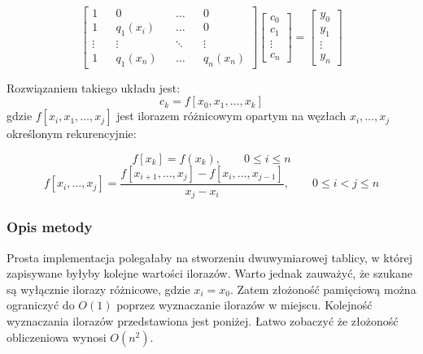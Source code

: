 \documentclass{article}
\begin{document}
\[
\begin{bmatrix}
    1 && 0 && \ldots && 0 \\
    1 && q_1(x_i) && \ldots && 0 \\
    \vdots && \vdots && \ddots && \vdots \\
    1 && q_1(x_n) && \ldots && q_n(x_n)
\end{bmatrix}
\begin{bmatrix}
    c_0 \\
    c_1 \\
    \vdots \\
    c_n
\end{bmatrix}
=
\begin{bmatrix}
    y_0 \\
    y_1 \\
    \vdots \\
    y_n
\end{bmatrix}
\]

Rozwiązaniem takiego układu jest:
\[
c_k = f[x_0, x_1, \ldots, x_k]
\] gdzie $f[x_i, x_1, \ldots, x_j]$ jest ilorazem różnicowym opartym na węzłach $x_i, \ldots, x_j$ określonym rekurencyjnie:

\[
f[x_k] = f(x_k), \quad \quad 0 \leq i \leq n
\]
\[
f[x_i, \ldots, x_j] = \frac{f[x_{i+1}, \ldots, x_j] - f[x_i, \ldots, x_{j-1}]}{x_j - x_i}, \quad \quad 0 \leq i < j \leq n
\]
\subsubsection{Opis metody}
Prosta implementacja polegałaby na stworzeniu dwuwymiarowej tablicy, w której zapisywane byłyby kolejne wartości ilorazów. Warto jednak zauważyć, 
że szukane są wyłącznie ilorazy różnicowe, gdzie $x_i = x_0$. Zatem złożoność pamięciową można ograniczyć do $O(1)$ poprzez wyznaczanie ilorazów w miejscu.
Kolejność wyznaczania ilorazów przedstawiona jest poniżej. Łatwo zobaczyć że złożoność obliczeniowa wynosi $O(n^2)$.
\end{document}
